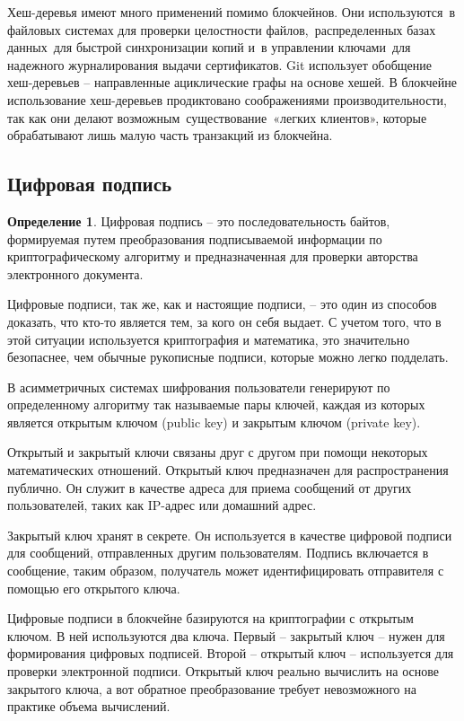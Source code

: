 \documentclass[och, master, nir]{SCWorks_fix}
\theoremstyle{plain}
\theoremstyle{plain}
\theoremstyle{plain}
\theoremstyle{definition}
\newtheorem{defn}{Определение}
\begin{document}
Хеш-деревья имеют много применений помимо блокчейнов. Они используются в файловых системах для проверки целостности файлов, распределенных базах данных для быстрой синхронизации копий и в управлении ключами для надежного журналирования выдачи сертификатов. Git использует обобщение хеш-деревьев – направленные ациклические графы на основе хешей. В блокчейне использование хеш-деревьев продиктовано соображениями производительности, так как они делают возможным существование «легких клиентов», которые обрабатывают лишь малую часть транзакций из блокчейна.

\subsection{Цифровая подпись}
\begin{defn}
Цифровая подпись – это последовательность байтов, формируемая путем преобразования подписываемой информации по криптографическому алгоритму и предназначенная для проверки авторства электронного документа.\cite{bib:block:3}
\end{defn}

Цифровые подписи, так же, как и настоящие подписи, – это один из способов доказать, что кто-то является тем, за кого он себя выдает. С учетом того, что в этой ситуации используется криптография и математика, это значительно безопаснее, чем обычные рукописные подписи, которые можно легко подделать.

В асимметричных системах шифрования пользователи генерируют по определенному алгоритму так называемые пары ключей, каждая из которых является открытым ключом (public key) и закрытым ключом (private key).

Открытый и закрытый ключи связаны друг с другом при помощи некоторых математических отношений. Открытый ключ предназначен для распространения публично. Он служит в качестве адреса для приема сообщений от других пользователей, таких как IP-адрес или домашний адрес.

Закрытый ключ хранят в секрете. Он используется в качестве цифровой подписи для сообщений, отправленных другим пользователям. Подпись включается в сообщение, таким образом, получатель может идентифицировать отправителя с помощью его открытого ключа.

Цифровые подписи в блокчейне базируются на криптографии с открытым ключом. В ней используются два ключа. Первый – закрытый ключ – нужен для формирования цифровых подписей. Второй – открытый ключ – используется для проверки электронной подписи. Открытый ключ реально вычислить на основе закрытого ключа, а вот обратное преобразование требует невозможного на практике объема вычислений. 
\end{document}
